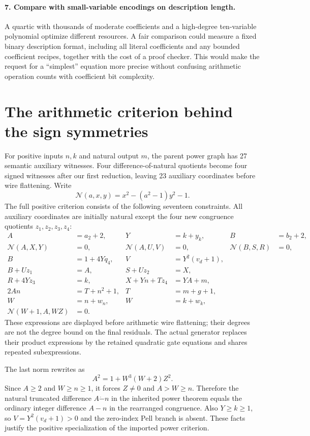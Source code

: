 \documentclass[11pt,letterpaper]{article}
\theoremstyle{definition}
\begin{document}
\paragraph{7. Compare with small-variable encodings on description length.}
A quartic with thousands of moderate coefficients and a high-degree
ten-variable polynomial optimize different resources. A fair comparison
could measure a fixed binary description format, including all literal
coefficients and any bounded coefficient recipes, together with the
cost of a proof checker. This would make the request for a ``simplest''
equation more precise without confusing arithmetic operation counts
with coefficient bit complexity.

\appendix
\section{The arithmetic criterion behind the sign symmetries}
\label{app:power}

For positive inputs $n,k$ and natural output $m$, the parent power
graph has 27 semantic auxiliary witnesses. Four difference-of-natural
quotients become four signed witnesses after our first reduction,
leaving 23 auxiliary coordinates before wire flattening. Write
\[
\mathcal N(a,x,y)=x^2-(a^2-1)y^2-1.
\]
The full positive criterion consists of the following seventeen
constraints. All auxiliary coordinates are initially natural except
the four new congruence quotients $z_1,z_2,z_3,z_4$:
\begin{align*}
A&=a_2+2,&Y&=k+y_k,&B&=b_2+2,\\
\mathcal N(A,X,Y)&=0,&\mathcal N(A,U,V)&=0,&\mathcal N(B,S,R)&=0,\\
B&=1+4Yq_4,&V&=Y^2(v_d+1),\\
B+Uz_1&=A,&S+Uz_2&=X,\\
R+4Yz_3&=k,&X+Yn+Tz_4&=YA+m,\\
2An&=T+n^2+1,&T&=m+g+1,\\
W&=n+w_n,&W&=k+w_k,\\
\mathcal N(W+1,A,WZ)&=0.&&
\end{align*}
These expressions are displayed before arithmetic wire flattening;
their degrees are not the degree bound on the final residuals. The
actual generator replaces their product expressions by the retained
quadratic gate equations and shares repeated subexpressions.

The last norm rewrites as
\[
A^2=1+W^3(W+2)Z^2.
\]
Since $A\ge2$ and $W\ge n\ge1$, it forces $Z\ne0$ and
$A>W\ge n$. Therefore the natural truncated difference
$A\mathbin{\dot-}n$ in the inherited power theorem equals the ordinary
integer difference $A-n$ in the rearranged congruence. Also
$Y\ge k\ge1$, so $V=Y^2(v_d+1)>0$ and the zero-index Pell branch is
absent. These facts justify the positive specialization of the
imported power criterion.
\end{document}

